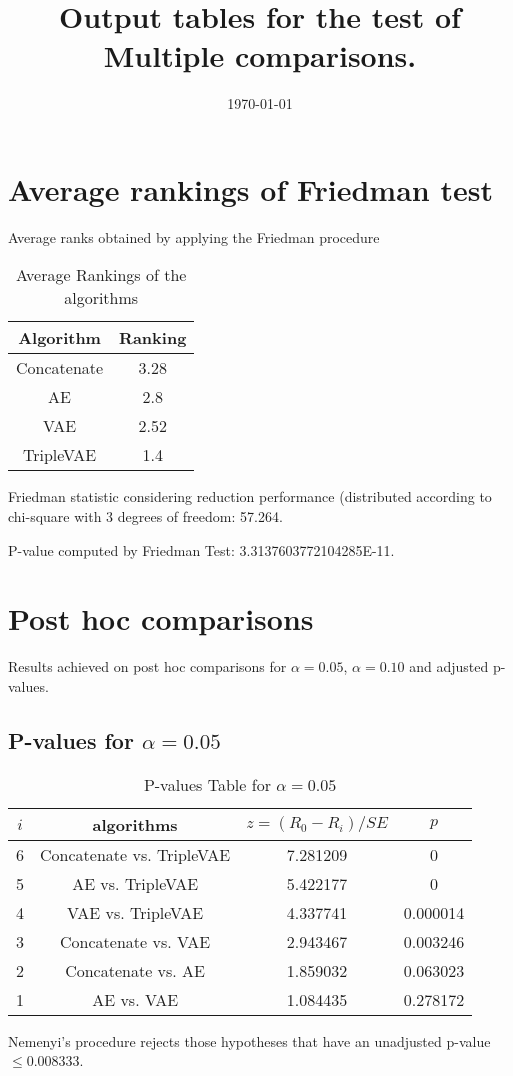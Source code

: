 \documentclass[a4paper,10pt]{article}
\title{Output tables for the test of Multiple comparisons.}
\author{}
\date{\today}
\begin{document}
\begin{landscape}
\pagestyle{empty}
\maketitle
\thispagestyle{empty}
\section{Average rankings of Friedman test}



Average ranks obtained by applying the Friedman procedure

\begin{table}[!htp]
\centering
\begin{tabular}{|c|c|}\hline
Algorithm&Ranking\\\hline
Concatenate & 3.28\\
AE & 2.8\\
VAE & 2.52\\
TripleVAE & 1.4\\
\hline
\end{tabular}
\caption{Average Rankings of the algorithms}
\end{table}

Friedman statistic considering reduction performance (distributed according to chi-square with 3 degrees of freedom: 57.264.

P-value computed by Friedman Test: 3.3137603772104285E-11.\newline



\pagebreak

\section{Post hoc comparisons}

Results achieved on post hoc comparisons for $\alpha = 0.05$, $\alpha = 0.10$ and adjusted p-values.

\subsection{P-values for $\alpha=0.05$}

\begin{table}[!htp]
\centering\scriptsize
\begin{tabular}{cccc}
$i$&algorithms&$z=(R_0 - R_i)/SE$&$p$\\
\hline6&Concatenate vs. TripleVAE&7.281209&0\\
5&AE vs. TripleVAE&5.422177&0\\
4&VAE vs. TripleVAE&4.337741&0.000014\\
3&Concatenate vs. VAE&2.943467&0.003246\\
2&Concatenate vs. AE&1.859032&0.063023\\
1&AE vs. VAE&1.084435&0.278172\\
\hline
\end{tabular}
\caption{P-values Table for $\alpha=0.05$}
\end{table}Nemenyi's procedure rejects those hypotheses that have an unadjusted p-value $\le0.008333$.


\end{landscape}
\end{document}
